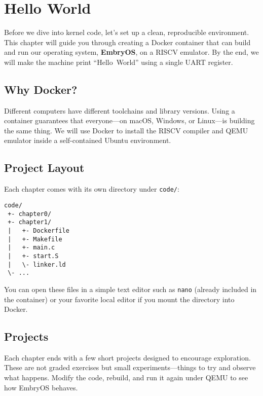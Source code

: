 \chapter{Hello World}

Before we dive into kernel code, let's set up a clean, reproducible environment.
This chapter will guide you through creating a Docker container that can build
and run our operating system, \textbf{EmbryOS}, on a RISC\textendash V
emulator.  By the end, we will make the machine print ``Hello~World'' using a
single UART register.

\section{Why Docker?}

Different computers have different toolchains and library versions.  Using a
container guarantees that everyone---on macOS, Windows, or Linux---is building
the same thing.  We will use Docker to install the RISC\textendash V compiler
and QEMU emulator inside a self-contained Ubuntu environment.

\section{Project Layout}

Each chapter comes with its own directory under \texttt{code/}:

\begin{verbatim}
code/
 +- chapter0/
 +- chapter1/
 |   +- Dockerfile
 |   +- Makefile
 |   +- main.c
 |   +- start.S
 |   \- linker.ld
 \- ...
\end{verbatim}

You can open these files in a simple text editor such as \texttt{nano} (already
included in the container) or your favorite local editor if you mount the
directory into Docker.







\section*{Projects}

Each chapter ends with a few short projects designed to encourage exploration.
These are not graded exercises but small experiments—things to try and observe
what happens.  Modify the code, rebuild, and run it again under QEMU to see how
EmbryOS behaves.


